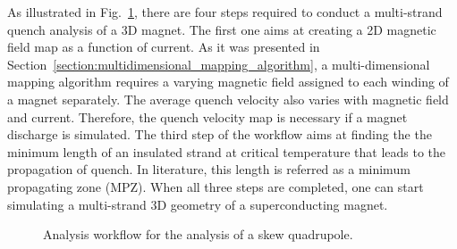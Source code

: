 
As illustrated in Fig.~\ref{fig:block_diagram_skew_quad_analysis_workflow}, there are four steps required to conduct a multi-strand quench analysis of a 3D magnet. The first one aims at creating a 2D magnetic field map as a function of current. As it was presented in Section~\ref{section:multidimensional_mapping_algorithm}, a multi-dimensional mapping algorithm requires a varying magnetic field assigned to each winding of a magnet separately. The average quench velocity also varies with magnetic field and current. Therefore, the quench velocity map is necessary if a magnet discharge is simulated.
The third step of the workflow aims at finding the the minimum length of an insulated strand at critical temperature that leads to the propagation of quench. In literature, this length is referred as a minimum propagating zone (MPZ). When all three steps are completed, one can start simulating a multi-strand 3D geometry of a superconducting magnet.

\begin{figure}[H]
    \centering
    \caption{Analysis workflow for the analysis of a skew quadrupole.}
    \label{fig:block_diagram_skew_quad_analysis_workflow}
\end{figure}
